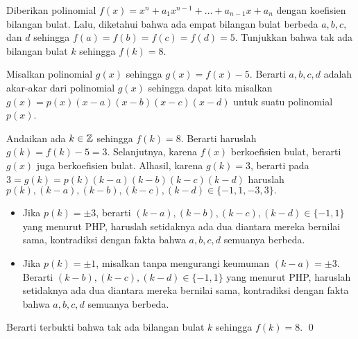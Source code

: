 \documentclass[11pt]{scrartcl}
\begin{document}
	\begin{soalbaru} 
		Diberikan polinomial $f(x)=x^n+a_1x^{n-1}+\dots+a_{n-1}x+a_n$ dengan koefisien bilangan bulat. Lalu, diketahui bahwa ada empat bilangan bulat berbeda $a,b,c,$ dan $d$ sehingga $f(a)=f(b)=f(c)=f(d)=5$. Tunjukkan bahwa tak ada bilangan bulat $k$ sehingga $f(k)=8$.
		\\[-10pt]
				\begin{solusi}
				Misalkan polinomial $g(x)$ sehingga $g(x)=f(x)-5$. Berarti $a,b,c,d$ adalah akar-akar dari polinomial $g(x)$ sehingga dapat kita misalkan $g(x)=p(x)(x-a)(x-b)(x-c)(x-d)$ untuk suatu polinomial $p(x)$.
				
				Andaikan ada $k \in \mathbb Z$ sehingga $f(k)=8$. Berarti haruslah $g(k)=f(k)-5=3$. Selanjutnya, karena $f(x)$ berkoefisien bulat, berarti $g(x)$ juga berkoefisien bulat. Alhasil, karena $g(k)=3$, berarti pada $3=g(k)=p(k)(k-a)(k-b)(k-c)(k-d)$ haruslah \\$p(k), (k-a), (k-b), (k-c), (k-d) \in \{-1,1,-3,3\}.$
				
				\begin{itemize}
				\item Jika $p(k)=\pm 3$, berarti $(k-a), (k-b), (k-c), (k-d) \in \{-1,1\}$ yang menurut PHP, haruslah setidaknya ada dua diantara mereka bernilai sama, kontradiksi dengan fakta bahwa $a,b,c,d$ semuanya berbeda.
								
				\item Jika $p(k)=\pm 1$, misalkan tanpa mengurangi keumuman $(k-a)=\pm3$. Berarti $(k-b), (k-c), (k-d) \in \{-1,1\}$ yang menurut PHP, haruslah setidaknya ada dua diantara mereka bernilai sama, kontradiksi dengan fakta bahwa $a,b,c,d$ semuanya berbeda.
				\end{itemize}
				
				Berarti terbukti bahwa tak ada bilangan bulat $k$ sehingga $f(k)=8$. \qed
				\end{solusi}
	\end{soalbaru}
	\newpage
\end{document}
